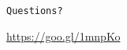 \documentclass{beamer}
\begin{document}
  
\begin{frame}
\begin{center}
\begin{huge}
  \texttt{Questions?}
\end{huge}
\end{center}
\normalfont
\end{frame}
  
\begin{frame}
\begin{center}
  \begin{huge}
    \url{https://goo.gl/1mnpKo}
\end{huge}
\end{center}
\normalfont
\end{frame}
\end{document}
